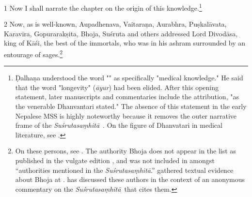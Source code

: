 \documentclass[12pt]{article}
\renewcommand{\SS}{\emph{Suśrutasaṃhitā}}
\let\se\saneng  %
\begin{document}
\begin{translation}

    \item[1] Now I shall narrate the chapter on the origin of this
knowledge.\footnote{Ḍalhaṇa understood the word "\se{veda}{knowledge}" as
specifically "medical knowledge." He said that the word "longevity"
(\emph{āyur})  had been elided.
%    
%    
%    
After this opening statement, later manuscripts and commentaries include
the attribution, "as the venerable Dhanvantari stated."  The absence of this
statement in the early Nepalese MSS is highly noteworthy because it removes
the outer narrative frame of the \SS\
\parencites[148]{wuja-2013}[\S\,3.1.2]{kleb-2021b}.  On the figure of Dhanvatari in 
medical literature, see \cite[IA 358--361]{meul-hist}.} %
    
    \item[2] Now, as is well-known, Aupadhenava, Vaitaraṇa, Aurabhra, Puṣkalāvata,
Karavīra, Gopurarakṣita, Bhoja, Suśruta and others addressed Lord Divodāsa,
king of Kāśi, the best of the immortals, who was in his ashram surrounded by
an entourage of sages.\footnote{On these persons, see \cite[IA
361--363, 369\,ff.]{meul-hist}. The authority Bhoja does not appear in the list as
published in the vulgate edition \citep[1]{susr-trikamji2}, and was not
included in \cite{meul-hist} amongst “authorities mentioned in the \SS.” 
\citeauthor{meul-hist} gathered textual evidence about Bhoja at \cite[IA
690--691]{meul-hist}. \citet{kleb-2021a} has discussed these authors in the
context of an anonymous commentary on the \SS\ that cites them.}

\nocite{emen-1969}
    
    

\end{translation}
\end{document}
